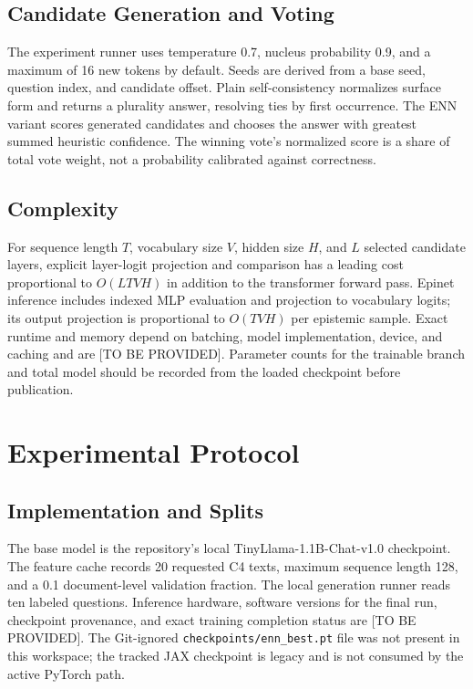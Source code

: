 \documentclass[conference]{IEEEtran}
\begin{document}
\subsection{Candidate Generation and Voting}
The experiment runner uses temperature 0.7, nucleus probability 0.9, and a maximum of 16 new tokens by default. Seeds are derived from a base seed, question index, and candidate offset. Plain self-consistency normalizes surface form and returns a plurality answer, resolving ties by first occurrence. The ENN variant scores generated candidates and chooses the answer with greatest summed heuristic confidence. The winning vote's normalized score is a share of total vote weight, not a probability calibrated against correctness.

\subsection{Complexity}
For sequence length $T$, vocabulary size $V$, hidden size $H$, and $L$ selected candidate layers, explicit layer-logit projection and comparison has a leading cost proportional to $O(LTVH)$ in addition to the transformer forward pass. Epinet inference includes indexed MLP evaluation and projection to vocabulary logits; its output projection is proportional to $O(TVH)$ per epistemic sample. Exact runtime and memory depend on batching, model implementation, device, and caching and are [TO BE PROVIDED]. Parameter counts for the trainable branch and total model should be recorded from the loaded checkpoint before publication.

\section{Experimental Protocol}
\subsection{Implementation and Splits}
The base model is the repository's local TinyLlama-1.1B-Chat-v1.0 checkpoint. The feature cache records 20 requested C4 texts, maximum sequence length 128, and a 0.1 document-level validation fraction. The local generation runner reads ten labeled questions. Inference hardware, software versions for the final run, checkpoint provenance, and exact training completion status are [TO BE PROVIDED]. The Git-ignored \texttt{checkpoints/enn\_best.pt} file was not present in this workspace; the tracked JAX checkpoint is legacy and is not consumed by the active PyTorch path.
\end{document}
